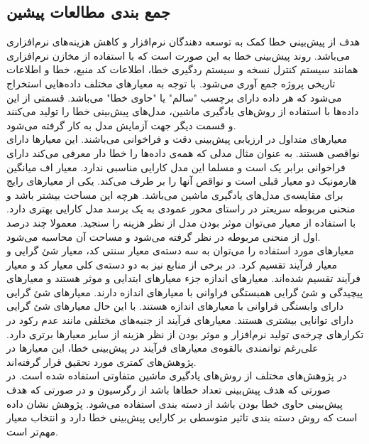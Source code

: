 \subsection{جمع بندی مطالعات پیشین}
هدف از پیش‌بینی خطا کمک به توسعه دهندگان نرم‌افزار و کاهش هزینه‌های نرم‌افزاری می‌باشد. روند پیش‌بینی خطا به این صورت است که با استفاده از مخازن نرم‌افزاری همانند سیستم کنترل نسخه و سیستم ردگیری خطا، اطلاعات کد منبع، خطا و اطلاعات تاریخی پروژه جمع آوری می‌شود. با توجه به معیارهای مختلف داده‌هایی استخراج می‌شود که هر داده دارای برچسب "سالم" یا "حاوی خطا" می‌باشد. قسمتی از این داده‌ها با استفاده از روش‌های یادگیری ماشین، مدل‌های پیش‌بینی خطا را تولید می‌کنند و قسمت دیگر جهت آزمایش مدل به کار گرفته می‌شود.\\

معیارهای متداول در ارزیابی پیش‌بینی دقت و فراخوانی می‌باشند. این معیارها دارای نواقصی هستند. به عنوان مثال مدلی که همه‌ی داده‌ها را خطا دار معرفی می‌کند دارای فراخوانی  برابر یک است و مسلما این مدل کارایی مناسبی ندارد. معیار اف  میانگین هارمونیک دو معیار قبلی است و نواقص آنها را بر طرف می‌کند. یکی از معیار‌های رایج برای مقایسه‌ی مدل‌های یادگیری ماشین  می‌باشد. هرچه این مساحت بیشتر باشد و منحنی مربوطه سریعتر  در راستای محور عمودی  به یک برسد مدل کارایی بهتری دارد. با استفاده از معیار  می‌توان موثر بودن مدل از نظر هزینه را سنجید. معمولا چند درصد اول از منحنی مربوطه در نظر گرفته می‌شود و مساحت آن محاسبه می‌شود. \\

معیارهای مورد استفاده را می‌توان به سه دسته‌ی معیار سنتی کد، معیار شئ گرایی و معیار فرآیند تقسیم کرد. در برخی از منابع نیز  به دو دسته‌ی کلی معیار کد و معیار فرآیند تقسیم شده‌اند. معیارهای اندازه جزء معیارهای ابتدایی و موثر هستند و معیارهای پیچیدگی و شئ گرایی همبستگی فراوانی با معیارهای اندازه دارند. معیارهای شئ گرایی دارای وابستگی فراوانی با معیار‌های اندازه هستند. با این حال معیارهای شئ گرایی دارای توانایی بیشتری هستند. معیارهای فرآیند از جنبه‌های مختلفی  مانند عدم رکود در تکرار‌های چرخه‌ی تولید نرم‌افزار و موثر بودن از نظر هزینه از سایر معیارها برتری دارد. علی‌رغم توانمندی بالقوه‌ی معیارهای فرآیند در پیش‌بینی خطا، این معیارها در پژوهش‌های کمتری مورد تحقیق قرار گرفته‌اند. \\

در پژوهش‌های مختلف از روش‌های یادگیری ماشین متفاوتی استفاده شده است. در صورتی که هدف پیش‌بینی تعداد خطاها باشد از رگرسیون و در صورتی که هدف پیش‌بینی حاوی خطا بودن باشد از دسته بندی استفاده می‌شود. پژوهش \cite{arisholm2010systematic}  نشان داده است که روش دسته بندی تاثیر متوسطی بر کارایی پیش‌بینی خطا دارد و انتخاب معیار مهم‌تر است. \\

